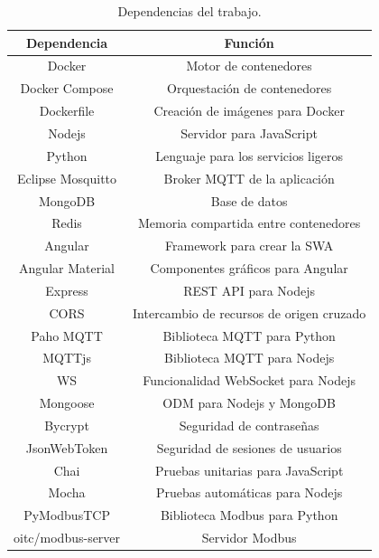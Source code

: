 \begin{table}[h]
	\centering
	\caption{\label{tab:dependencias}Dependencias del trabajo.}
	\begin{tabular}{c c}
		\toprule
		\textbf{Dependencia}      & \textbf{Función}                          \\
		\midrule
		Docker             & Motor de contenedores                     \\
		Docker Compose     & Orquestación de contenedores              \\
		Dockerfile         & Creación de imágenes para Docker          \\
		Nodejs             & Servidor para JavaScript                  \\
		Python             & Lenguaje para los servicios ligeros       \\
		Eclipse Mosquitto  & Broker MQTT de la aplicación              \\
		MongoDB            & Base de datos                             \\
		Redis              & Memoria compartida entre contenedores     \\
		Angular            & Framework para crear la SWA               \\
		Angular Material   & Componentes gráficos para Angular         \\
		Express            & REST API para Nodejs                      \\
		CORS               & Intercambio de recursos de origen cruzado \\
		Paho MQTT          & Biblioteca MQTT para Python               \\
		MQTTjs             & Biblioteca MQTT para Nodejs               \\
		WS                 & Funcionalidad WebSocket para Nodejs       \\
		Mongoose           & ODM para Nodejs y MongoDB                 \\
		Bycrypt            & Seguridad de contraseñas                  \\
		JsonWebToken       & Seguridad de sesiones de usuarios         \\
		Chai               & Pruebas unitarias para JavaScript         \\
		Mocha              & Pruebas automáticas para Nodejs           \\
		PyModbusTCP        & Biblioteca Modbus para Python             \\
		oitc/modbus-server & Servidor Modbus                           \\
		\bottomrule
		\hline
	\end{tabular}
\end{table}

